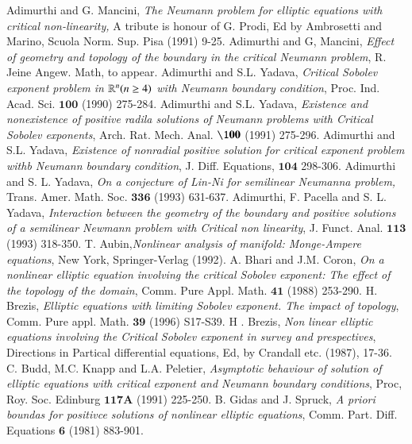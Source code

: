 \begin{thebibliography}{99}
 Adimurthi and G. Mancini, \textit{The Neumann problem for elliptic equations with critical non-linearity,} A tribute is honour of G. Prodi, Ed by Ambrosetti and Marino, Scuola Norm. Sup. Pisa (1991) 9-25.
 Adimurthi and G, Mancini, \textit{Effect of geometry and topology of the boundary in the critical Neumann problem}, R. Jeine Angew. Math, to appear.
 Adimurthi and S.L. Yadava, \textit{Critical Sobolev exponent problem in $\mathbb{R}^{n}(n\geq 4)$ with Neumann boundary condition}, Proc. Ind. Acad. Sci. ${\mathbf {100}}$ (1990) 275-284.
 Adimurthi and S.L. Yadava, \textit{Existence and nonexistence of positive radila solutions of Neumann problems with Critical Sobolev exponents}, Arch. Rat. Mech. Anal. ${\mathbf{\100}}$ (1991) 275-296.
 Adimurthi and S.L. Yadava, \textit{Existence of nonradial positive solution for critical exponent problem withb Neumann boundary condition}, J. Diff. Equations, ${\mathbf{104}}$ 298-306.
 Adimurthi and S. L. Yadava, \textit{On a conjecture of Lin-Ni for semilinear Neumanna problem,} Trans. Amer. Math. Soc. ${\mathbf{336}}$ (1993) 631-637.
 Adimurthi, F. Pacella and S. L. Yadava, \textit{Interaction between the geometry of the boundary and positive solutions of a semilinear Newmann problem with Critical non linearity}, J. Funct. Anal. ${\mathbf{113}}$ (1993) 318-350.
 T. Aubin,\pageoriginale \textit{Nonlinear analysis of manifold: Monge-Ampere equations}, New York, Springer-Verlag (1992).
 A. Bhari and J.M. Coron, \textit{On a nonlinear elliptic equation involving the critical Sobolev exponent: The effect of the topology of the domain}, Comm. Pure Appl. Math. ${\mathbf{41}}$ (1988) 253-290.
 H. Brezis, \textit{Elliptic equations with limiting Sobolev exponent. The impact of topology}, Comm. Pure appl. Math. ${\mathbf{39}}$ (1996) S17-S39.
 H . Brezis, \textit{Non linear elliptic equations involving the Critical Sobolev exponent in survey and prespectives}, Directions in Partical differential equations, Ed, by Crandall etc. (1987),  17-36.
 C. Budd, M.C. Knapp and L.A. Peletier, \textit{Asymptotic behaviour of solution of elliptic equations with critical exponent and Neumann boundary conditions}, Proc, Roy. Soc. Edinburg ${\mathbf{117A}}$ (1991) 225-250.
 B. Gidas and J. Spruck, \textit{A priori boundas for positivce solutions of nonlinear elliptic equations}, Comm. Part. Diff. Equations ${\mathbf{6}}$ (1981) 883-901.

\end{thebibliography}
